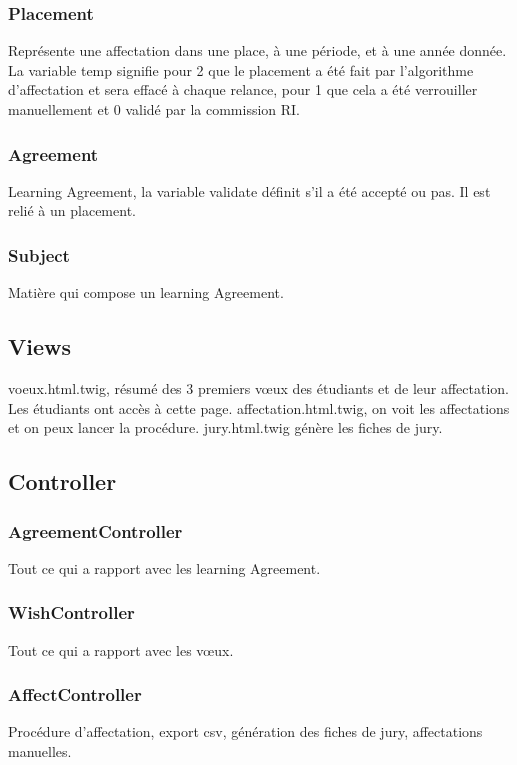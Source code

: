 \subsubsection{Placement}
Représente une affectation dans une place, à une période, et à une année donnée. La variable temp signifie pour 2 que le placement a été fait par l'algorithme d'affectation et sera effacé à chaque relance, pour 1 que cela a été verrouiller manuellement et 0 validé par la commission RI.

\subsubsection{Agreement}
Learning Agreement, la variable validate définit s'il a été accepté ou pas. Il est relié à un placement.

\subsubsection{Subject}
Matière qui compose un learning Agreement.

\subsection{Views}
voeux.html.twig, résumé des 3 premiers vœux des étudiants et de leur affectation. Les étudiants ont accès à cette page.
affectation.html.twig, on voit les affectations et on peux lancer la procédure.
jury.html.twig génère les fiches de jury.

\subsection{Controller}
\subsubsection{AgreementController}
Tout ce qui a rapport avec les learning Agreement.

\subsubsection{WishController}
Tout ce qui a rapport avec les vœux.

\subsubsection{AffectController}
Procédure d'affectation, export csv, génération des fiches de jury, affectations manuelles.

